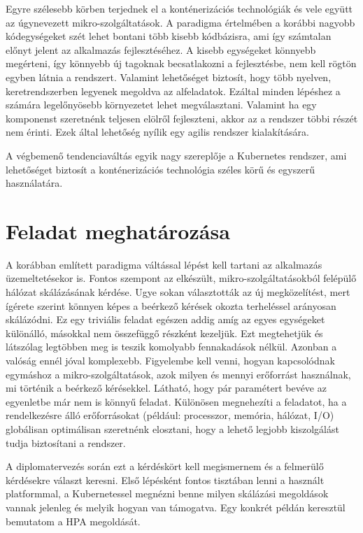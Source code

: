 Egyre szélesebb körben terjednek el a konténerizációs technológiák és vele együtt az úgynevezett mikro-szolgáltatások.
A paradigma értelmében a korábbi nagyobb kódegységeket szét lehet bontani több kisebb kódbázisra, ami így számtalan előnyt jelent az alkalmazás fejlesztéséhez.
A kisebb egységeket könnyebb megérteni, így könnyebb új tagoknak becsatlakozni a fejlesztésbe, nem kell rögtön egyben látnia a rendszert.
Valamint lehetőséget biztosít, hogy több nyelven, keretrendszerben legyenek megoldva az alfeladatok. Ezáltal minden lépéshez a számára legelőnyösebb környezetet lehet megválasztani. Valamint ha egy komponenst szeretnénk teljesen elölről fejleszteni, akkor az a rendszer többi részét nem érinti.
Ezek által lehetőség nyílik egy agilis rendszer kialakítására.

A végbemenő tendenciaváltás egyik nagy szereplője a Kubernetes rendszer, ami lehetőséget biztosít a konténerizációs technológia széles körű és egyszerű használatára.

\section{Feladat meghatározása}
A korábban említett paradigma váltással lépést kell tartani az alkalmazás üzemeltetésekor is. Fontos szempont az elkészült, mikro-szolgáltatásokból felépülő hálózat skálázásának kérdése. Ugye sokan választották az új megközelítést, mert ígérete szerint könnyen képes a beérkező kérések okozta terheléssel arányosan skálázódni.
Ez egy triviális feladat egészen addig amíg az egyes egységeket különálló, másokkal nem összefüggő részként kezeljük.
Ezt megtehetjük és látszólag legtöbben meg is teszik komolyabb fennakadások nélkül. 
Azonban a valóság ennél jóval komplexebb. Figyelembe kell venni, hogyan kapcsolódnak egymáshoz a mikro-szolgáltatások, azok milyen és mennyi erőforrást használnak, mi történik a beérkező kérésekkel.
Látható, hogy pár paramétert bevéve az egyenletbe már nem is könnyű feladat. 
Különösen megnehezíti a feladatot, ha a rendelkezésre álló erőforrásokat (például: processzor, memória, hálózat, I/O) globálisan optimálisan szeretnénk elosztani, hogy a lehető legjobb kiszolgálást tudja biztosítani a rendszer. 

A diplomatervezés során ezt a kérdéskört kell megismernem és a felmerülő kérdésekre választ keresni. Első lépésként fontos tisztában lenni a használt platformmal, a Kubernetessel megnézni benne milyen skálázási megoldások vannak jelenleg és melyik hogyan van támogatva. Egy konkrét példán keresztül bemutatom a HPA megoldását. 

